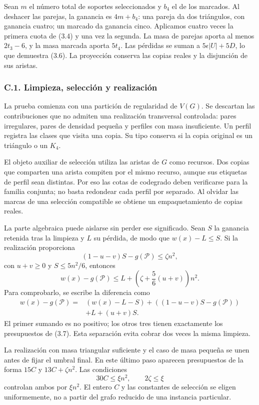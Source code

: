 \documentclass[spanish,11pt,a4paper]{article}
\begin{document}
Sean \(m\) el número total de soportes seleccionados y \(b_4\) el de los marcados. Al deshacer las parejas, la ganancia es \(4m+b_4\): una pareja da dos triángulos, con ganancia cuatro; un marcado da ganancia cinco. Aplicamos cuatro veces la primera cuota de (3.4) y una vez la segunda. La masa de parejas aporta al menos \(2t_3-6\), y la masa marcada aporta \(5t_4\). Las pérdidas se suman a \(5\epsilon|U|+5D\), lo que demuestra (3.6). La proyección conserva las copias reales y la disjunción de sus aristas.

\subsubsection{C.1. Limpieza, selección y realización}\label{c.1.-limpieza-selecciuxf3n-y-realizaciuxf3n}

La prueba comienza con una partición de regularidad de \(V(G)\). Se descartan las contribuciones que no admiten una realización transversal controlada: pares irregulares, pares de densidad pequeña y perfiles con masa insuficiente. Un perfil registra las clases que visita una copia. Su tipo conserva si la copia original es un triángulo o un \(K_4\).

El objeto auxiliar de selección utiliza las aristas de \(G\) como recursos. Dos copias que comparten una arista compiten por el mismo recurso, aunque sus etiquetas de perfil sean distintas. Por eso las cotas de codegrado deben verificarse para la familia conjunta; no basta redondear cada perfil por separado. Al olvidar las marcas de una selección compatible se obtiene un empaquetamiento de copias reales.

La parte algebraica puede aislarse sin perder ese significado. Sean \(S\) la ganancia retenida tras la limpieza y \(L\) su pérdida, de modo que \(w(x)-L\le S\). Si la realización proporciona \[
(1-u-v)S-g(\mathcal P)\le\zeta n^2,
\] con \(u+v\ge0\) y \(S\le5n^2/6\), entonces \[
w(x)-g(\mathcal P)
\le L+\left(\zeta+\frac56(u+v)\right)n^2.
\tag{3.7}
\] Para comprobarlo, se escribe la diferencia como \[
\begin{aligned}
w(x)-g(\mathcal P)
={}&(w(x)-L-S)+((1-u-v)S-g(\mathcal P))\\
&+L+(u+v)S.
\end{aligned}
\] El primer sumando es no positivo; los otros tres tienen exactamente los presupuestos de (3.7). Esta separación evita cobrar dos veces la misma limpieza.

La realización con masa triangular suficiente y el caso de masa pequeña se unen antes de fijar el umbral final. En este último paso aparecen presupuestos de la forma \(15C\) y \(13C+\zeta n^2\). Las condiciones \[
30C\le\xi n^2,\qquad 2\zeta\le\xi
\] controlan ambos por \(\xi n^2\). El entero \(C\) y las constantes de selección se eligen uniformemente, no a partir del grafo reducido de una instancia particular.
\end{document}
